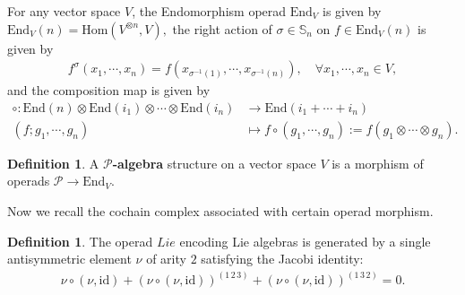 \documentclass[12pt]{amsart}
\theoremstyle{definition}
\newtheorem{defi}[thm]{Definition}
\newcommand{\id}{\mathrm{id}}
\newcommand{\Hom}{\mathrm{Hom}}
\newcommand{\End}{\mathrm{End}}
\newcommand{\ot}{\otimes}
\newcommand{\cc}{\circ}
\begin{document}
For any vector space $V$, the Endomorphism operad $\End_V$ is given by
$
\End_V(n)=\Hom(V^{\ot n},V),
$
the right action of $\sigma\in\mathbb{S}_n$ on $f\in\End_V(n)$ is given by
\begin{eqnarray}\label{action-on-map}
	f^\sigma(x_1,\cdots,x_n)=f(x_{\sigma^{-1}(1)},\cdots,x_{\sigma^{-1}(n)}),\quad\forall x_1,\cdots,x_n\in V,
\end{eqnarray}
and the composition map is given by
\begin{align*}
	\circ: \End(n) \otimes \End(i_1) \otimes \cdots \otimes \End(i_n) &\to \End(i_1 + \cdots + i_n)\\
	(f;g_1,\cdots,g_n)&\mapsto f\circ(g_1,\cdots,g_n):=f(g_1\ot \cdots\ot g_n).
\end{align*}

\begin{defi}\label{def-P-algebra}
A {\bf $\mathcal{P}$-algebra} structure on a vector space $V$ is a morphism of operads $\mathcal{P}\to \End_V$.
\end{defi}


Now we recall the cochain complex associated with certain operad morphism.

\begin{defi}\label{def-Lie-operad}
	The operad $Lie$ encoding Lie algebras is generated by a single antisymmetric element $\nu$ of arity $2$ satisfying the Jacobi identity:
	\begin{align*}
		\nu\cc(\nu, \id)+(\nu\cc(\nu,\id))^{(1\,2\,3)}+(\nu\cc(\nu,\id))^{(1\,3\,2)}=0.
	\end{align*}
\end{defi}
\end{document}
